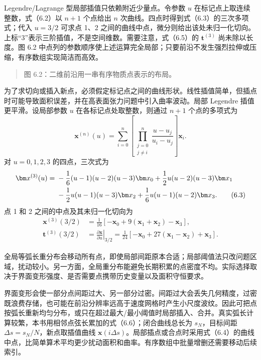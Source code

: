 \documentclass[11pt,a4paper,openany,fontset=none]{ctexbook}
\begin{document}
Legendre/Lagrange 型局部插值只依赖附近少量点。令参数 $u$ 在标记点上取连续整数，式（6.2）以 $n+1$ 个点给出 $n$ 次曲线。四点时得到式（6.3）的三次多项式；代入 $u=3/2$ 可求点 1、2 之间的曲线中点，微分则给出该处未归一化切向。上标“3”表示三阶插值，不是空间维数。需要注意，式（6.5）的 $\bm t^{(3)}$ 尚未除以长度。图 6.2 中点列的参数顺序使上述运算完全局部；只要前沿不发生强烈拉伸或压缩，有序数组实现简洁而高效。

\begin{quote}\small 图 6.2：二维前沿用一串有序物质点表示的布局。\end{quote}
为了求切向或插入新点，必须假定标记点之间的曲线形状。线性插值简单，但插点时可能导致面积误差，并在高表面张力问题中引入曲率波动。局部 Legendre 插值更平滑。设局部参数 $u$ 在各标记点处取整数，则通过 $n+1$ 个点的多项式为
\begin{equation}
\bm x^{(n)}(u)=\sum_{i=0}^{n}
\left[\prod_{\substack{j=0\\j\ne i}}^{n}\frac{u-u_j}{u_i-u_j}\right]\bm x_i.
\tag{6.2}
\end{equation}
对 $u=0,1,2,3$ 的四点，三次式为
\begin{align}
\bm x^{(3)}(u)={}&-\frac16(u-1)(u-2)(u-3)\bm x_0
+\frac12u(u-2)(u-3)\bm x_1\notag\\
&-\frac12u(u-1)(u-3)\bm x_2
+\frac16u(u-1)(u-2)\bm x_3.
\tag{6.3}
\end{align}
点 1 和 2 之间的中点及其未归一化切向为
\begin{align}
\bm x^{(3)}(3/2)&=\frac1{16}[-\bm x_0+9(\bm x_1+\bm x_2)-\bm x_3],
\tag{6.4}\\
\bm t^{(3)}(3/2)&=\left.\frac{\partial\bm x}{\partial u}\right|_{3/2}
=\frac1{24}[-\bm x_0+27(\bm x_1-\bm x_2)+\bm x_3].
\tag{6.5}
\end{align}

全局等弧长重分布会移动所有点，即使局部间距原本合适；局部阈值法只改问题区域，扰动较小。另一方面，全局重分布能避免长期积累的点密度不均。实际选择取决于界面变形强度、是否需要点携带历史变量以及面积守恒要求。

界面变形会使一部分点间距过大、另一部分过密。间距过大会丢失几何精度，过密既浪费存储，也可能在前沿分辨率远高于速度网格时产生小尺度波纹。因此可把点按弧长重新均匀分布，或只在超过最大/最小阈值时局部插入、合并。真实弧长计算较繁，本书用相邻点弦长累加的式（6.6）；闭合曲线总长为 $s_N$，目标间距 $\Delta s=s_N/N$，新点取插值曲线 $\bm x(i\Delta s)$。局部插点或合点时采用式（6.4）的曲线中点，比简单算术平均更少扰动面积和曲率。有序数组中批量增删还需要移动后续索引。
\end{document}
